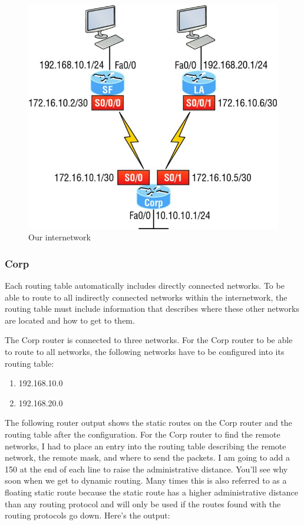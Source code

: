 \begin{figure}
   \centering
   \includegraphics{images/c09f008.jpg}
   \caption{Our internetwork}
   \label{fig:out-internetwork}
\end{figure}


\subsubsection{Corp}

Each routing table automatically includes directly connected networks.
To be able to route to all indirectly connected networks within the
internetwork, the routing table must include information that describes
where these other networks are located and how to get to them.

The Corp router is connected to three networks. For the Corp router to
be able to route to all networks, the following networks have to be
configured into its routing table:

\begin{enumerate}
\item
  192.168.10.0
\item
  192.168.20.0
\end{enumerate}

The following router output shows the static routes on the Corp router
and the routing table after the configuration. For the Corp router to
find the remote networks, I had to place an entry into the routing table
describing the remote network, the remote mask, and where to send the
packets. I am going to add a 150 at the end of each line to raise the
administrative distance. You'll see why soon when we get to dynamic
routing. Many times this is also referred to as a floating static route
because the static route has a higher
\protect\hypertarget{c09.xhtmlux5cux23Page_385}{}{}administrative
distance than any routing protocol and will only be used if the routes
found with the routing protocols go down. Here's the output:

